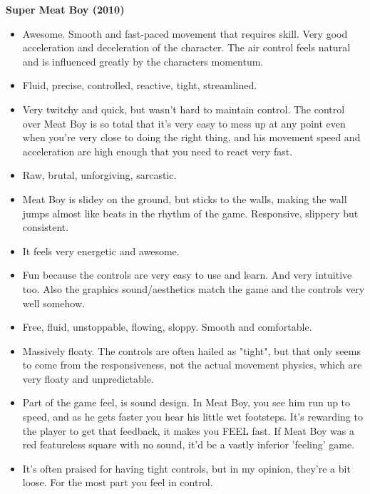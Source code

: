 \textbf{Super Meat Boy (2010)}
\vspace{-5mm}
\begin{itemize}[noitemsep,nolistsep]
\item Awesome. Smooth and fast-paced movement that requires skill. Very good acceleration and deceleration of the character. The air control feels natural and is influenced greatly by the characters momentum. 
\item Fluid, precise, controlled, reactive, tight, streamlined.
\item Very twitchy and quick, but wasn't hard to maintain control. The control over Meat Boy is so total that it's very easy to mess up at any point even when you're very close to doing the right thing, and his movement speed and acceleration are high enough that you need to react very fast.
\item Raw, brutal, unforgiving, sarcastic.
\item Meat Boy is slidey on the ground, but sticks to the walls, making the wall jumps almost like beats in the rhythm of the game. Responsive, slippery but consistent.
\item It feels very energetic and awesome.
\item Fun because the controls are very easy to use and learn. And very intuitive too. Also the graphics sound/aesthetics match the game and the controls very well somehow.
\item Free, fluid, unstoppable, flowing, sloppy. Smooth and comfortable.
\item Massively floaty. The controls are often hailed as "tight", but that only seems to come from the responsiveness, not the actual movement physics, which are very floaty and unpredictable.
\item Part of the game feel, is sound design. In Meat Boy, you see him run up to speed, and as he gets faster you hear his little wet footsteps. It's rewarding to the player to get that feedback, it makes you FEEL fast. If Meat Boy was a red featureless square with no sound, it'd be a vastly inferior 'feeling' game.
\item It's often praised for having tight controls, but in my opinion, they're a bit loose. For the most part you feel in control.
\end{itemize}

